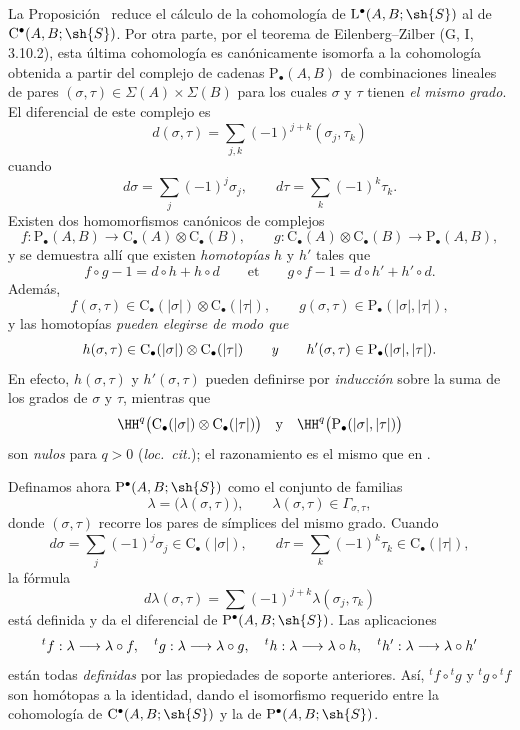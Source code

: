 \documentclass[oneside]{amsart}
\makeatletter
\newcommand{\ega@arrow}[2]{\mathchoice{#1}{#2}{#2}{#2}}
\renewcommand{\to}{\ega@arrow{\longrightarrow}{\rightarrow}}
\newcommand{\oldpage}[2][]{{\marginnote{\normalfont\textbf{#1}~|~#2}}\ignorespaces}
\let\EGAOriginalLabel\label
\renewcommand{\label}[1]{\phantomsection\EGAOriginalLabel{#1}}
\makeatother
\begin{document}
\begin{env}[11.8.6]
\label{0.11.8.6}
\oldpage[0\textsubscript{III}]{45}
La Proposición~ reduce el cálculo de la cohomología de
$\mathrm{L}^\bullet(A,B;\sh{S})$ al de
$\mathrm{C}^\bullet(A,B;\sh{S})$.
Por otra parte, por el teorema de Eilenberg--Zilber
(G, I, 3.10.2), esta última cohomología es canónicamente isomorfa a la
cohomología obtenida a partir del complejo de cadenas
$\mathrm{P}_\bullet(A,B)$ de combinaciones lineales de pares
$(\sigma,\tau)\in\Sigma(A)\times\Sigma(B)$ para los cuales $\sigma$ y
$\tau$ tienen \emph{el mismo grado}.
El diferencial de este complejo es
\[
  d(\sigma,\tau)
  =
  \sum_{j,k}(-1)^{j+k}(\sigma_j,\tau_k)
\]
cuando
\[
  d\sigma=\sum_j(-1)^j\sigma_j,
  \qquad
  d\tau=\sum_k(-1)^k\tau_k.
\]
Existen dos homomorfismos canónicos de complejos
\[
  f:\mathrm{P}_\bullet(A,B)
  \longrightarrow
  \mathrm{C}_\bullet(A)\otimes\mathrm{C}_\bullet(B),
  \qquad
  g:\mathrm{C}_\bullet(A)\otimes\mathrm{C}_\bullet(B)
  \longrightarrow
  \mathrm{P}_\bullet(A,B),
\]
y se demuestra allí que existen \emph{homotopías} $h$ y $h'$ tales que
\[
  f\circ g-1=d\circ h+h\circ d\qquad\text{et}
  \qquad
  g\circ f-1=d\circ h'+h'\circ d.
\]
Además,
\[
  f(\sigma,\tau)
  \in
  \mathrm{C}_\bullet(|\sigma|)
  \otimes
  \mathrm{C}_\bullet(|\tau|),
  \qquad
  g(\sigma,\tau)
  \in
  \mathrm{P}_\bullet(|\sigma|,|\tau|),
\]
y las homotopías \emph{pueden elegirse de modo que}
\[
  h(\sigma,\tau)
  \in
  \mathrm{C}_\bullet(|\sigma|)
  \otimes
  \mathrm{C}_\bullet(|\tau|)
  \qquad\text{\emph{y}}\qquad
  h'(\sigma,\tau)
  \in
  \mathrm{P}_\bullet(|\sigma|,|\tau|).
\]
En efecto, $h(\sigma,\tau)$ y $h'(\sigma,\tau)$ pueden definirse por
\emph{inducción} sobre la suma de los grados de $\sigma$ y $\tau$, mientras que
\[
  \HH^q\bigl(
    \mathrm{C}_\bullet(|\sigma|)
    \otimes
    \mathrm{C}_\bullet(|\tau|)
  \bigr)
  \quad\text{y}\quad
  \HH^q\bigl(\mathrm{P}_\bullet(|\sigma|,|\tau|)\bigr)
\]
son \emph{nulos} para $q>0$
(\emph{loc.\ cit.}); el razonamiento es el mismo que en
.

Definamos ahora $\mathrm{P}^\bullet(A,B;\sh{S})$ como el conjunto de familias
\[
  \lambda=\bigl(\lambda(\sigma,\tau)\bigr),
  \qquad
  \lambda(\sigma,\tau)\in\Gamma_{\sigma,\tau},
\]
donde $(\sigma,\tau)$ recorre los pares de símplices del mismo grado.
Cuando
\[
  d\sigma=\sum_j(-1)^j\sigma_j\in\mathrm{C}_\bullet(|\sigma|),
  \qquad
  d\tau=\sum_k(-1)^k\tau_k\in\mathrm{C}_\bullet(|\tau|),
\]
la fórmula
\[
  d\lambda(\sigma,\tau)
  =
  \sum(-1)^{j+k}\lambda(\sigma_j,\tau_k)
\]
está definida y da el diferencial de
$\mathrm{P}^\bullet(A,B;\sh{S})$.
Las aplicaciones
\[
  {}^tf:\lambda\to\lambda\circ f,\quad
  {}^tg:\lambda\to\lambda\circ g,\quad
  {}^th:\lambda\to\lambda\circ h,\quad
  {}^th':\lambda\to\lambda\circ h'
\]
están todas \emph{definidas} por las propiedades de soporte anteriores.
Así, ${}^tf\circ{}^tg$ y ${}^tg\circ{}^tf$ son homótopas a la
identidad, dando el isomorfismo requerido entre la cohomología de
$\mathrm{C}^\bullet(A,B;\sh{S})$ y la de
$\mathrm{P}^\bullet(A,B;\sh{S})$.
\end{env}
\end{document}
